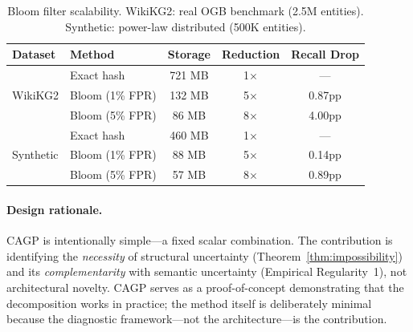 \begin{table}[ht]
\centering
\caption{Bloom filter scalability. WikiKG2: real OGB benchmark (2.5M entities). Synthetic: power-law distributed (500K entities).}
\label{tab:bloom_scale}
\small
\begin{tabular}{llccc}
\toprule
Dataset & Method & Storage & Reduction & Recall Drop \\
\midrule
\multirow{3}{*}{WikiKG2} & Exact hash & 721 MB & 1$\times$ & --- \\
& Bloom (1\% FPR) & 132 MB & 5$\times$ & 0.87pp \\
& Bloom (5\% FPR) & 86 MB & 8$\times$ & 4.00pp \\
\midrule
\multirow{3}{*}{Synthetic} & Exact hash & 460 MB & 1$\times$ & --- \\
& Bloom (1\% FPR) & 88 MB & 5$\times$ & 0.14pp \\
& Bloom (5\% FPR) & 57 MB & 8$\times$ & 0.89pp \\
\bottomrule
\end{tabular}
\end{table}

\paragraph{Design rationale.}
CAGP is intentionally simple---a fixed scalar combination. The contribution is identifying the \emph{necessity} of structural uncertainty (Theorem~\ref{thm:impossibility}) and its \emph{complementarity} with semantic uncertainty (Empirical Regularity~1), not architectural novelty. CAGP serves as a proof-of-concept demonstrating that the decomposition works in practice; the method itself is deliberately minimal because the diagnostic framework---not the architecture---is the contribution.

